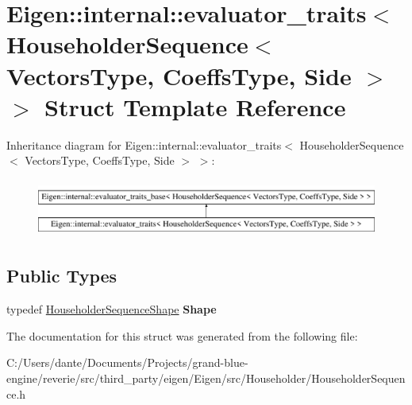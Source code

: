 \hypertarget{struct_eigen_1_1internal_1_1evaluator__traits_3_01_householder_sequence_3_01_vectors_type_00_01_5d5adf52607be62fe2f73ff93bacbb36}{}\section{Eigen\+::internal\+::evaluator\+\_\+traits$<$ Householder\+Sequence$<$ Vectors\+Type, Coeffs\+Type, Side $>$ $>$ Struct Template Reference}
\label{struct_eigen_1_1internal_1_1evaluator__traits_3_01_householder_sequence_3_01_vectors_type_00_01_5d5adf52607be62fe2f73ff93bacbb36}
Inheritance diagram for Eigen\+::internal\+::evaluator\+\_\+traits$<$ Householder\+Sequence$<$ Vectors\+Type, Coeffs\+Type, Side $>$ $>$\+:\begin{figure}[H]
\begin{center}
\leavevmode
\includegraphics[height=1.921098cm]{struct_eigen_1_1internal_1_1evaluator__traits_3_01_householder_sequence_3_01_vectors_type_00_01_5d5adf52607be62fe2f73ff93bacbb36}
\end{center}
\end{figure}
\subsection*{Public Types}
\begin{DoxyCompactItemize}
\item 
\mbox{\label{struct_eigen_1_1internal_1_1evaluator__traits_3_01_householder_sequence_3_01_vectors_type_00_01_5d5adf52607be62fe2f73ff93bacbb36_abbf16f651753ca94ef4b580ed6589381}} 
typedef \mbox{\hyperlink{struct_eigen_1_1internal_1_1_householder_sequence_shape}{Householder\+Sequence\+Shape}} {\bfseries Shape}
\end{DoxyCompactItemize}


The documentation for this struct was generated from the following file\+:\begin{DoxyCompactItemize}
\item 
C\+:/\+Users/dante/\+Documents/\+Projects/grand-\/blue-\/engine/reverie/src/third\+\_\+party/eigen/\+Eigen/src/\+Householder/Householder\+Sequence.\+h\end{DoxyCompactItemize}
